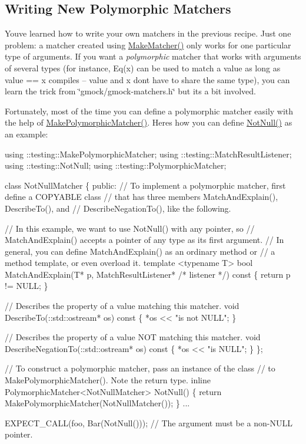 \subsection*{Writing New Polymorphic Matchers}

You\textquotesingle{}ve learned how to write your own matchers in the previous recipe. Just one problem\+: a matcher created using {\ttfamily \hyperlink{namespacetesting_a37fd8029ac00e60952440a3d9cca8166}{Make\+Matcher()}} only works for one particular type of arguments. If you want a {\itshape polymorphic} matcher that works with arguments of several types (for instance, {\ttfamily Eq(x)} can be used to match a {\ttfamily value} as long as {\ttfamily value} == {\ttfamily x} compiles -- {\ttfamily value} and {\ttfamily x} don\textquotesingle{}t have to share the same type), you can learn the trick from {\ttfamily \char`\"{}gmock/gmock-\/matchers.\+h\char`\"{}} but it\textquotesingle{}s a bit involved.

Fortunately, most of the time you can define a polymorphic matcher easily with the help of {\ttfamily \hyperlink{namespacetesting_a667ca94f190ec2e17ee2fbfdb7d3da04}{Make\+Polymorphic\+Matcher()}}. Here\textquotesingle{}s how you can define {\ttfamily \hyperlink{namespacetesting_a39d1f92b53b8b2a0b6db6a22ac146416}{Not\+Null()}} as an example\+:


\begin{DoxyCode}
using ::testing::MakePolymorphicMatcher;
using ::testing::MatchResultListener;
using ::testing::NotNull;
using ::testing::PolymorphicMatcher;

class NotNullMatcher \{
 public:
  // To implement a polymorphic matcher, first define a COPYABLE class
  // that has three members MatchAndExplain(), DescribeTo(), and
  // DescribeNegationTo(), like the following.

  // In this example, we want to use NotNull() with any pointer, so
  // MatchAndExplain() accepts a pointer of any type as its first argument.
  // In general, you can define MatchAndExplain() as an ordinary method or
  // a method template, or even overload it.
  template <typename T>
  bool MatchAndExplain(T* p,
                       MatchResultListener* /* listener */) const \{
    return p != NULL;
  \}

  // Describes the property of a value matching this matcher.
  void DescribeTo(::std::ostream* os) const \{ *os << "is not NULL"; \}

  // Describes the property of a value NOT matching this matcher.
  void DescribeNegationTo(::std::ostream* os) const \{ *os << "is NULL"; \}
\};

// To construct a polymorphic matcher, pass an instance of the class
// to MakePolymorphicMatcher().  Note the return type.
inline PolymorphicMatcher<NotNullMatcher> NotNull() \{
  return MakePolymorphicMatcher(NotNullMatcher());
\}
...

  EXPECT\_CALL(foo, Bar(NotNull()));  // The argument must be a non-NULL pointer.
\end{DoxyCode}


